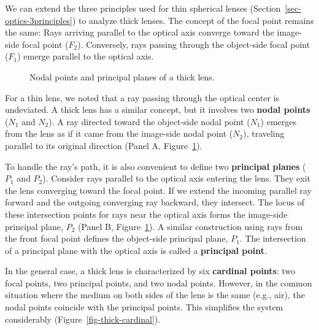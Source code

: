 \documentclass[
  letterpaper,
]{book}
\begin{document}
We can extend the three principles used for thin spherical lenses
(Section~\ref{sec-optics-3principles}) to analyze thick lenses. The
concept of the focal point remains the same: Rays arriving parallel to
the optical axis converge toward the image-side focal point (\(F_2\)).
Conversely, rays passing through the object-side focal point (\(F_1\))
emerge parallel to the optical axis.

\begin{figure}


\caption{\label{fig-cardinal-points}Nodal points and principal planes of
a thick lens.}

\end{figure}%

For a thin lens, we noted that a ray passing through the optical center
is undeviated. A thick lens has a similar concept, but it involves two
\textbf{nodal points} (\(N_1\) and \(N_2\)). A ray directed toward the
object-side nodal point (\(N_1\)) emerges from the lens as if it came
from the image-side nodal point (\(N_2\)), traveling parallel to its
original direction (Panel A, Figure~\ref{fig-cardinal-points}).

To handle the ray's path, it is also convenient to define two
\textbf{principal planes} (\(P_1\) and \(P_2\)). Consider rays parallel
to the optical axis entering the lens. They exit the lens converging
toward the focal point. If we extend the incoming parallel ray forward
and the outgoing converging ray backward, they intersect. The locus of
these intersection points for rays near the optical axis forms the
image-side principal plane, \(P_2\) (Panel B,
Figure~\ref{fig-cardinal-points}). A similar construction using rays
from the front focal point defines the object-side principal plane,
\(P_1\). The intersection of a principal plane with the optical axis is
called a \textbf{principal point}.

In the general case, a thick lens is characterized by six
\textbf{cardinal points}: two focal points, two principal points, and
two nodal points. However, in the common situation where the medium on
both sides of the lens is the same (e.g., air), the nodal points
coincide with the principal points. This simplifies the system
considerably (Figure~\ref{fig-thick-cardinal}).
\end{document}
